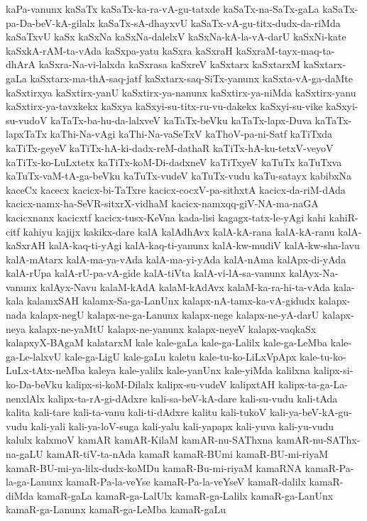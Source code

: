 {kaPa-vanunx
kaSaTx
kaSaTx-ka-ra-vA-gu-tatxde
kaSaTx-na-SaTx-gaLa
kaSaTx-pa-Da-beV-kA-gilalx
kaSaTx-sA-dhayxvU
kaSaTx-vA-gu-titx-dudx-da-riMda
kaSaTxvU
kaSx
kaSxNa
kaSxNa-dalelxV
kaSxNa-kA-la-vA-darU
kaSxNi-kate
kaSxkA-rAM-ta-vAda
kaSxpa-yatu
kaSxra
kaSxraH
kaSxraM-tayx-maq-ta-dhArA
kaSxra-Na-vi-lalxda
kaSxrasa
kaSxreV
kaSxtarx
kaSxtarxM
kaSxtarx-gaLa
kaSxtarx-ma-thA-saq-jatf
kaSxtarx-saq-SiTx-yanunx
kaSxta-vA-ga-daMte
kaSxtirxya
kaSxtirx-yanU
kaSxtirx-ya-nanunx
kaSxtirx-ya-niMda
kaSxtirx-yanu
kaSxtirx-ya-tavxkekx
kaSxya
kaSxyi-su-titx-ru-vu-dakekx
kaSxyi-su-vike
kaSxyi-su-vudoV
kaTaTx-ba-hu-da-lalxveV
kaTaTx-beVku
kaTaTx-lapx-Duva
kaTaTx-lapxTaTx
kaThi-Na-vAgi
kaThi-Na-vaSeTxV
kaThoV-pa-ni-Satf
kaTiTxda
kaTiTx-geyeV
kaTiTx-hA-ki-dadx-reM-dathaR
kaTiTx-hA-ku-tetxV-veyoV
kaTiTx-ko-LuLxtetx
kaTiTx-koM-Di-dadxneV
kaTiTxyeV
kaTuTx
kaTuTxva
kaTuTx-vaM-tA-ga-beVku
kaTuTx-vudeV
kaTuTx-vudu
kaTu-satayx
kabibxNa
kaceCx
kacecx
kacicx-bi-TaTxre
kacicx-cocxV-pa-sithxtA
kacicx-da-riM-dAda
kacicx-namx-ha-SeVR-sitxrX-vidhaM
kacicx-namxqq-giV-NA-ma-naGA
kacicxnanx
kacicxtf
kacicx-tusx-KeVna
kada-lisi
kagagx-tatx-le-yAgi
kahi
kahiR-citf
kahiyu
kajijx
kakikx-dare
kalA
kalAdhAvx
kalA-kA-rana
kalA-kA-ranu
kalA-kaSxrAH
kalA-kaq-ti-yAgi
kalA-kaq-ti-yanunx
kalA-kw-mudiV
kalA-kw-sha-lavu
kalA-mAtarx
kalA-ma-ya-vAda
kalA-ma-yi-yAda
kalA-nAma
kalApx-di-yAda
kalA-rUpa
kalA-rU-pa-vA-gide
kalA-tiVta
kalA-vi-lA-sa-vanunx
kalAyx-Na-vanunx
kalAyx-Navu
kalaM-kAdA
kalaM-kAdAvx
kalaM-ka-ra-hi-ta-vAda
kala-kala
kalamxSAH
kalamx-Sa-ga-LanUnx
kalapx-nA-tamx-ka-vA-gidudx
kalapx-nada
kalapx-negU
kalapx-ne-ga-Lanunx
kalapx-nege
kalapx-ne-yA-darU
kalapx-neya
kalapx-ne-yaMtU
kalapx-ne-yanunx
kalapx-neyeV
kalapx-vaqkaSx
kalapxyX-BAgaM
kalatarxM
kale
kale-gaLa
kale-ga-Lalilx
kale-ga-LeMba
kale-ga-Le-lalxvU
kale-ga-LigU
kale-gaLu
kaletu
kale-tu-ko-LiLxVpApx
kale-tu-ko-LuLx-tAtx-neMba
kaleya
kale-yalilx
kale-yanUnx
kale-yiMda
kalilxna
kalipx-si-ko-Da-beVku
kalipx-si-koM-Dilalx
kalipx-su-vudeV
kalipxtAH
kalipx-ta-ga-La-nenxlAlx
kalipx-ta-rA-gi-dAdxre
kali-sa-beV-kA-dare
kali-su-vudu
kali-tAda
kalita
kali-tare
kali-ta-vanu
kali-ti-dAdxre
kalitu
kali-tukoV
kali-ya-beV-kA-gu-vudu
kali-yali
kali-ya-loV-suga
kali-yalu
kali-yapapx
kali-yuva
kali-yu-vudu
kalulx
kalxmoV
kamAR
kamAR-KilaM
kamAR-nu-SAThxna
kamAR-nu-SAThx-na-gaLU
kamAR-tiV-ta-nAda
kamaR
kamaR-BUmi
kamaR-BU-mi-riyaM
kamaR-BU-mi-ya-lilx-dudx-koMDu
kamaR-Bu-mi-riyaM
kamaRNA
kamaR-Pa-la-ga-Lanunx
kamaR-Pa-la-veYse
kamaR-Pa-la-veYseV
kamaR-dalilx
kamaR-diMda
kamaR-gaLa
kamaR-ga-LalUlx
kamaR-ga-Lalilx
kamaR-ga-LanUnx
kamaR-ga-Lanunx
kamaR-ga-LeMba
kamaR-gaLu
}

